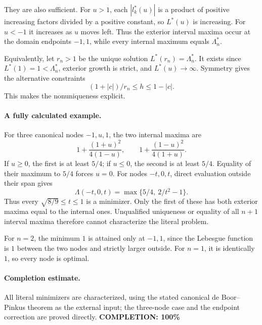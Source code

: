 They are also sufficient. For \(u>1\), each \(|l_k^*(u)|\) is a product of positive increasing factors divided by a positive constant, so \(L^*(u)\) is increasing. For \(u<-1\) it increases as \(u\) moves left. Thus the exterior interval maxima occur at the domain endpoints \(-1,1\), while every internal maximum equals \(\Lambda_n^*\).

Equivalently, let \(r_n>1\) be the unique solution \(L^*(r_n)=\Lambda_n^*\). It exists since \(L^*(1)=1<\Lambda_n^*\), exterior growth is strict, and \(L^*(u)\to\infty\).
Symmetry gives the alternative constraints
\[
 (1+|c|)/r_n\leq h\leq1-|c|.
\]
This makes the nonuniqueness explicit.

\paragraph{A fully calculated example.}
For three canonical nodes \(-1,u,1\), the two internal maxima are
\[
 1+\frac{(1+u)^2}{4(1-u)},\qquad
 1+\frac{(1-u)^2}{4(1+u)}.
\]
If \(u\geq0\), the first is at least \(5/4\); if \(u\leq0\), the second is at least \(5/4\). Equality of their maximum to \(5/4\) forces \(u=0\).
For nodes \(-t,0,t\), direct evaluation outside their span gives
\[
 \Lambda(-t,0,t)=\max\{5/4,\ 2/t^2-1\}.
\]
Thus every \(\sqrt{8/9}\leq t\leq1\) is a minimizer. Only the first of these has both exterior maxima equal to the internal ones. Unqualified uniqueness or equality of all \(n+1\) interval maxima therefore cannot characterize the literal problem.

For \(n=2\), the minimum \(1\) is attained only at \(-1,1\), since the Lebesgue function is \(1\) between the two nodes and strictly larger outside. For \(n=1\), it is identically \(1\), so every node is optimal.

\paragraph{Completion estimate.}
All literal minimizers are characterized, using the stated canonical de Boor--Pinkus theorem as the external input; the three-node case and the endpoint correction are proved directly.
\textbf{COMPLETION: 100\%}
